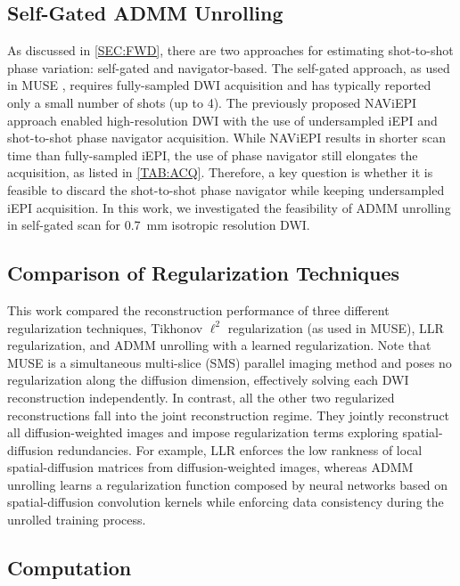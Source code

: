 \documentclass[journal,twoside,web]{ieeecolor}
\begin{document}
	\subsection{Self-Gated ADMM Unrolling}

	As discussed in \cref{SEC:FWD}, there are two approaches for
	estimating shot-to-shot phase variation: self-gated and navigator-based.
	The self-gated approach, as used in MUSE \cite{chen_2013_muse},
	requires fully-sampled DWI acquisition and
	has typically reported only a small number of shots (up to 4).
	The previously proposed NAViEPI approach enabled high-resolution DWI
	with the use of undersampled iEPI and shot-to-shot phase navigator acquisition.
	While NAViEPI results in shorter scan time than fully-sampled iEPI,
	the use of phase navigator still elongates the acquisition,
	as listed in \cref{TAB:ACQ}.
	Therefore, a key question is whether it is feasible to
	discard the shot-to-shot phase navigator 
	while keeping undersampled iEPI acquisition.
	In this work, we investigated the feasibility of ADMM unrolling in self-gated scan
	for \SI{0.7}{\milli\meter} isotropic resolution DWI.

	\subsection{Comparison of Regularization Techniques}
	
	This work compared the reconstruction performance
	of three different regularization techniques,
	Tikhonov $\ell^2$ regularization (as used in MUSE),
	LLR regularization,
	and ADMM unrolling with a learned regularization.
	Note that MUSE is a simultaneous multi-slice (SMS) parallel imaging method
	and poses no regularization along the diffusion dimension,
	effectively solving each DWI reconstruction independently.
	In contrast, all the other two regularized reconstructions
	fall into the joint reconstruction regime.
	They jointly reconstruct all diffusion-weighted images
	and impose regularization terms exploring spatial-diffusion redundancies.
	For example, LLR enforces the low rankness of
	local spatial-diffusion matrices from diffusion-weighted images,
	whereas ADMM unrolling learns a regularization function composed by neural networks
	based on spatial-diffusion convolution kernels
	while enforcing data consistency during the unrolled training process.

	\subsection{Computation}
\end{document}
